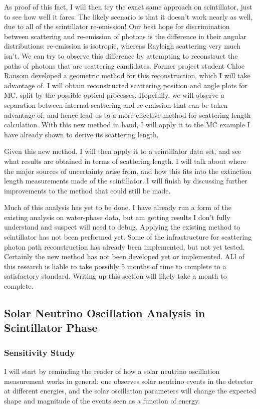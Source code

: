 As proof of this fact, I will then try the exact same approach on scintillator, just to see how well it fares. The likely scenario is that it doesn't work nearly as well, due to all of the scintillator re-emission! Our best hope for discrimination between scattering and re-emission of photons is the difference in their angular distributions: re-emission is isotropic, whereas Rayleigh scattering very much isn't. We can try to observe this difference by attempting to reconstruct the paths of photons that are scattering candidates. Former project student Chloe Ransom developed a geometric method for this reconstruction, which I will take advantage of. I will obtain reconstructed scattering position and angle plots for MC, split by the possible optical processes. Hopefully, we will observe a separation between internal scattering and re-emission that can be taken advantage of, and hence lead us to a more effective method for scattering length calculation. With this new method in hand, I will apply it to the MC example I have already shown to derive its scattering length.

Given this new method, I will then apply it to a scintillator data set, and see what results are obtained in terms of scattering length. I will talk about where the major sources of uncertainty arise from, and how this fits into the extinction length measurements made of the scintillator. I will finish by discussing further improvements to the method that could still be made.

Much of this analysis has yet to be done. I have already run a form of the existing analysis on water-phase data, but am getting results I don't fully understand and suspect will need to debug. Applying the existing method to scintillator has not been performed yet. Some of the infrastructure for scattering photon path reconstruction has already been implemented, but not yet tested. Certainly the new method has not been developed yet or implemented. ALl of this research is liable to take possibly 5 months of time to complete to a satisfactory standard. Writing up this section will likely take a month to complete.

\subsection{Solar Neutrino Oscillation Analysis in Scintillator Phase}
\subsubsection{Sensitivity Study}
I will start by reminding the reader of how a solar neutrino oscillation measurement works in general: one observes solar neutrino events in the detector at different energies, and the solar oscillation parameters will change the expected shape and magnitude of the events seen as a function of energy.


